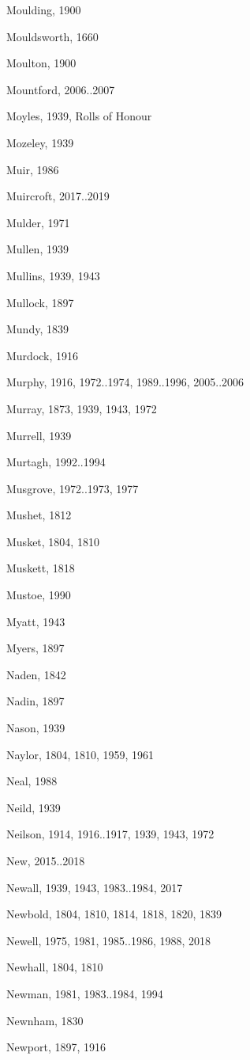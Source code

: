 {\begin{theindex}
\item Moulding, 1900
\item Mouldsworth, 1660
\item Moulton, 1900
\item Mountford, 2006..2007
\item Moyles, 1939, Rolls of Honour
\item Mozeley, 1939
\item Muir, 1986
\item Muircroft, 2017..2019
\item Mulder, 1971
\item Mullen, 1939
\item Mullins, 1939, 1943
\item Mullock, 1897
\item Mundy, 1839
\item Murdock, 1916
\item Murphy, 1916, 1972..1974, 1989..1996, 2005..2006
\item Murray, 1873, 1939, 1943, 1972
\item Murrell, 1939
\item Murtagh, 1992..1994
\item Musgrove, 1972..1973, 1977
\item Mushet, 1812
\item Musket, 1804, 1810
\item Muskett, 1818
\item Mustoe, 1990
\item Myatt, 1943
\item Myers, 1897
\item Naden, 1842
\item Nadin, 1897
\item Nason, 1939
\item Naylor, 1804, 1810, 1959, 1961
\item Neal, 1988
\item Neild, 1939
\item Neilson, 1914, 1916..1917, 1939, 1943, 1972
\item New, 2015..2018
\item Newall, 1939, 1943, 1983..1984, 2017
\item Newbold, 1804, 1810, 1814, 1818, 1820, 1839
\item Newell, 1975, 1981, 1985..1986, 1988, 2018
\item Newhall, 1804, 1810
\item Newman, 1981, 1983..1984, 1994
\item Newnham, 1830
\item Newport, 1897, 1916

\end{theindex}}

